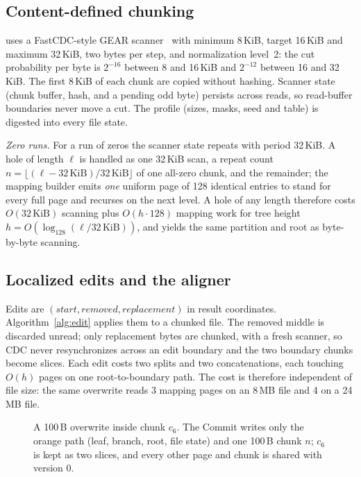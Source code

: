 \subsection{Content-defined chunking}

\sys{} uses a FastCDC-style GEAR scanner~\cite{fastcdc} with minimum 8\,KiB, target
16\,KiB and maximum 32\,KiB, two bytes per step, and normalization level~2: the cut
probability per byte is $2^{-16}$ between 8 and 16\,KiB and $2^{-12}$ between 16 and
32\,KiB. The first 8\,KiB of each chunk are copied without hashing. Scanner state
(chunk buffer, hash, and a pending odd byte) persists across reads, so read-buffer
boundaries never move a cut. The profile (sizes, masks, seed and table) is digested into
every file state.

\emph{Zero runs.} For a run of zeros the scanner state repeats with period 32\,KiB. A hole
of length $\ell$ is handled as one 32\,KiB scan, a repeat count $n = \lfloor(\ell -
32\,\mathrm{KiB})/32\,\mathrm{KiB}\rfloor$ of one all-zero chunk, and the remainder; the
mapping builder emits \emph{one} uniform page of 128 identical entries to stand for every
full page and recurses on the next level. A hole of any length therefore costs
$O(32\,\mathrm{KiB})$ scanning plus $O(h \cdot 128)$ mapping work for tree height $h =
O(\log_{128}(\ell/32\,\mathrm{KiB}))$, and yields the same partition and root as
byte-by-byte scanning.

\subsection{Localized edits and the aligner}

Edits are $(\mathit{start}, \mathit{removed}, \mathit{replacement})$ in result
coordinates. Algorithm~\ref{alg:edit} applies them to a chunked file. The removed middle
is discarded unread; only replacement bytes are chunked, with a fresh scanner, so CDC
never resynchronizes across an edit boundary and the two boundary chunks become slices.
Each edit costs two splits and two concatenations, each touching $O(h)$ pages on one
root-to-boundary path. The cost is therefore independent of file size: the same
overwrite reads 3 mapping pages on an 8\,MB file and 4 on a 24\,MB file.

\begin{figure}[h]
\centering
\resizebox{0.82\linewidth}{!}{}
\caption{A 100\,B overwrite inside chunk $c_6$. The Commit writes only the orange path (leaf, branch, root, file state) and one 100\,B chunk $n$; $c_6$ is kept as two slices, and every other page and chunk is shared with version 0.}
\label{fig:edittree}
\end{figure}

